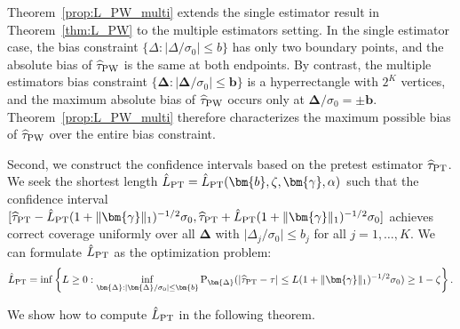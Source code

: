 \documentclass[11pt]{article}
\def\P{{\mathrm P}}
\newcommand{\htau}{\widehat\tau}
\numberwithin{equation}{section}
\theoremstyle{definition}
\begin{document}
Theorem~\ref{prop:L_PW_multi} extends the single estimator result in Theorem~\ref{thm:L_PW} to the multiple estimators setting. In the single estimator case, the bias constraint $\{\Delta: \lvert \Delta/\sigma_0 \rvert \le b\}$ has only two boundary points, and the absolute bias of $\htau_{\rm PW}$ is the same at both endpoints. By contrast, the multiple estimators bias constraint $\{\bm{\Delta}: \lvert \bm{\Delta}/\sigma_0 \rvert \le \bm{b}\}$ is a hyperrectangle with $2^K$ vertices, and the maximum absolute bias of $\htau_{\rm PW}$ occurs only at $\bm{\Delta}/\sigma_0 = \pm \bm{b}$. Theorem~\ref{prop:L_PW_multi} therefore characterizes the maximum possible bias of $\htau_{\rm PW}$ over the entire bias constraint.

Second, we construct the confidence intervals based on the pretest estimator $\htau_{\rm PT}$. We seek the shortest length $\hat{L}_{\rm PT} = \hat{L}_{\rm PT}(\bm{b}, \zeta, \bm{\gamma}, \alpha)$ such that the confidence interval $[\htau_{\rm PT}- \hat{L}_{\rm PT} (1+\lVert \bm{\gamma} \rVert_1)^{-1/2} \sigma_0, \htau_{\rm PT}+ \hat{L}_{\rm PT} (1+\lVert \bm{\gamma} \rVert_1)^{-1/2} \sigma_0]$ achieves correct coverage uniformly over all $\bm{\Delta}$ with $\lvert \Delta_j/\sigma_0 \rvert \le b_j$ for all $j=1,\ldots,K$. We can formulate $\hat{L}_{\rm PT}$ as the optimization problem:
\begin{align}\label{eq:L_PT_multi}
  \hat{L}_{\rm PT} = \inf \left\{ L \ge 0: \inf_{\bm{\Delta}: \lvert \bm{\Delta}/\sigma_0 \rvert \le \bm{b}} \P_{\bm{\Delta}}(\lvert \htau_{\rm PT}- \tau \rvert \le L (1+\lVert \bm{\gamma} \rVert_1)^{-1/2} \sigma_0) \ge 1-\zeta \right\}. 
\end{align}

We show how to compute $\hat{L}_{\rm PT}$ in the following theorem.
\end{document}
